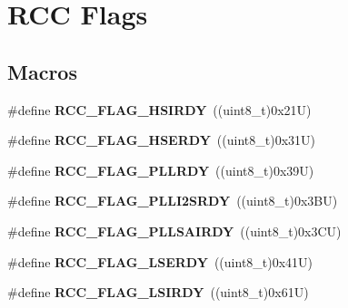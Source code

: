 \hypertarget{group___r_c_c___flag}{}\section{R\+CC Flags}
\label{group___r_c_c___flag}
\subsection*{Macros}
\begin{DoxyCompactItemize}
\item 
\mbox{\label{group___r_c_c___flag_ga827d986723e7ce652fa733bb8184d216}} 
\#define {\bfseries R\+C\+C\+\_\+\+F\+L\+A\+G\+\_\+\+H\+S\+I\+R\+DY}~((uint8\+\_\+t)0x21\+U)
\item 
\mbox{\label{group___r_c_c___flag_ga173edf47bec93cf269a0e8d0fec9997c}} 
\#define {\bfseries R\+C\+C\+\_\+\+F\+L\+A\+G\+\_\+\+H\+S\+E\+R\+DY}~((uint8\+\_\+t)0x31\+U)
\item 
\mbox{\label{group___r_c_c___flag_gaf82d8afb18d9df75db1d6c08b9c50046}} 
\#define {\bfseries R\+C\+C\+\_\+\+F\+L\+A\+G\+\_\+\+P\+L\+L\+R\+DY}~((uint8\+\_\+t)0x39\+U)
\item 
\mbox{\label{group___r_c_c___flag_ga31e67a9f19cf673acf196d19f443f3d5}} 
\#define {\bfseries R\+C\+C\+\_\+\+F\+L\+A\+G\+\_\+\+P\+L\+L\+I2\+S\+R\+DY}~((uint8\+\_\+t)0x3\+B\+U)
\item 
\mbox{\label{group___r_c_c___flag_ga950937b7612d558939956056d9632b96}} 
\#define {\bfseries R\+C\+C\+\_\+\+F\+L\+A\+G\+\_\+\+P\+L\+L\+S\+A\+I\+R\+DY}~((uint8\+\_\+t)0x3\+C\+U)
\item 
\mbox{\label{group___r_c_c___flag_gac9fb963db446c16e46a18908f7fe1927}} 
\#define {\bfseries R\+C\+C\+\_\+\+F\+L\+A\+G\+\_\+\+L\+S\+E\+R\+DY}~((uint8\+\_\+t)0x41\+U)
\item 
\mbox{\label{group___r_c_c___flag_ga8c5e4992314d347597621bfe7ab10d72}} 
\#define {\bfseries R\+C\+C\+\_\+\+F\+L\+A\+G\+\_\+\+L\+S\+I\+R\+DY}~((uint8\+\_\+t)0x61\+U)
\item 
\mbox{\label{group___r_c_c___flag_ga23d5211abcdf0e397442ca534ca04bb4}} 

\end{DoxyCompactItemize}
